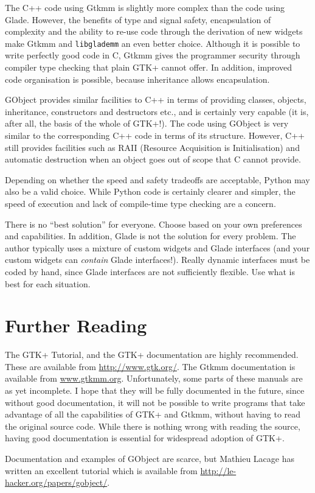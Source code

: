 \documentclass[a4paper,oneside]{article}
\newcommand{\program}[1]{\texttt{#1}}
\begin{document}
The C++ code using Gtkmm is slightly more complex than the code using
Glade.  However, the benefits of type and signal safety, encapsulation
of complexity and the ability to re-use code through the derivation of
new widgets make Gtkmm and \program{libglademm} an even better choice.
Although it is possible to write perfectly good code in C, Gtkmm gives
the programmer security through compiler type checking that plain GTK+
cannot offer.  In addition, improved code organisation is possible,
because inheritance allows encapsulation.

GObject provides similar facilities to C++ in terms of providing
classes, objects, inheritance, constructors and destructors etc., and
is certainly very capable (it is, after all, the basis of the whole of
GTK+!).  The code using GObject is very similar to the corresponding
C++ code in terms of its structure.  However, C++ still provides
facilities such as RAII (Resource Acquisition is Initialisation) and
automatic destruction when an object goes out of scope that C cannot
provide.

Depending on whether the speed and safety tradeoffs are acceptable,
Python may also be a valid choice.  While Python code is certainly
clearer and simpler, the speed of execution and lack of compile-time
type checking are a concern.

There is no ``best solution'' for everyone.  Choose based on your own
preferences and capabilities.  In addition, Glade is not the solution
for every problem.  The author typically uses a mixture of custom
widgets and Glade interfaces (and your custom widgets can
\emph{contain} Glade interfaces!).  Really dynamic interfaces must be
coded by hand, since Glade interfaces are not sufficiently flexible.
Use what is best for each situation.


\section{Further Reading}

The GTK+ Tutorial, and the GTK+ documentation are highly recommended.
These are available from \url{http://www.gtk.org/}.  The Gtkmm
documentation is available from \url{www.gtkmm.org}.  Unfortunately,
some parts of these manuals are as yet incomplete.  I hope that they
will be fully documented in the future, since without good
documentation, it will not be possible to write programs that take
advantage of all the capabilities of GTK+ and Gtkmm, without having to
read the original source code.  While there is nothing wrong with
reading the source, having good documentation is essential for
widespread adoption of GTK+.

Documentation and examples of GObject are scarce, but Mathieu Lacage
has written an excellent tutorial which is available from
\url{http://le-hacker.org/papers/gobject/}.
\end{document}
